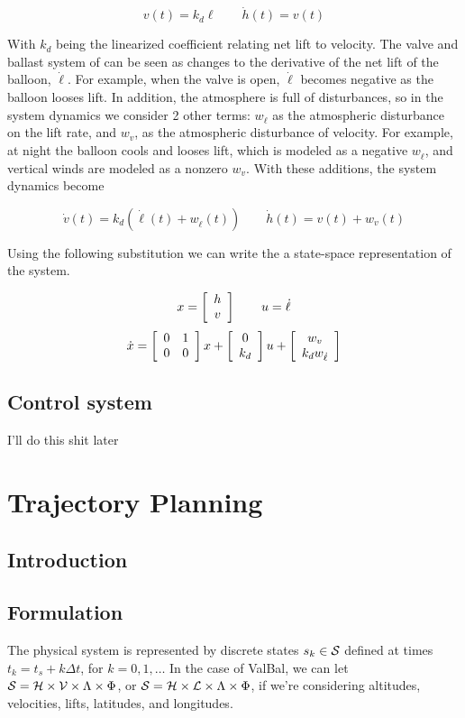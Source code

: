 \documentclass[11pt]{scrartcl} %
\begin{document}
\[ v(t) = k_d \ell \qquad \dot h(t) = v(t)\]

With $k_d$ being the linearized coefficient relating net lift to velocity. The valve and ballast system of can be seen as changes to the derivative of the net lift of the balloon, $\dot \ell$. For example, when the valve is open, $\dot \ell$ becomes negative as the balloon looses lift. In addition, the atmosphere is full of disturbances, so in the system dynamics we consider 2 other terms: $w_{\dot \ell}$ as the atmospheric disturbance on the lift rate, and $w_v$, as the atmospheric disturbance of velocity. For example, at night the balloon cools and looses lift, which is modeled as a negative $w_{\dot \ell}$, and vertical winds are modeled as a nonzero $w_v$. With these additions, the system dynamics become

\[ \dot v(t) = k_d(\dot \ell(t) + w_{\dot \ell}(t)) \qquad \dot h(t) = v(t) + w_v(t) \]

Using the following substitution we can write the a state-space representation of the system. 

\[x = \mx{c}{h \\ v} \qquad u = \dot \ell\]
\[\dot x = \mx{cc}{0 & 1 \\ 0 & 0}x + \mx{cc}{0 \\ k_d} u + \mx{c}{w_v \\ k_d w_{\dot \ell}}\]

\subsection{Control system}

I'll do this shit later

\section{Trajectory Planning}
\subsection{Introduction}

\subsection{Formulation}
The physical system is represented by discrete states $s_k\in\States$ defined at times $t_k=t_s + k \Delta t$, for $k=0,1,\dots$ In the case of ValBal, we can let $\States=\Altitudes\times\Velocities\times\Lambda\times\Phi$, or $\States=\Altitudes\times\Lifts\times\Lambda\times\Phi$, if we're considering altitudes, velocities, lifts, latitudes, and longitudes.
\end{document}
